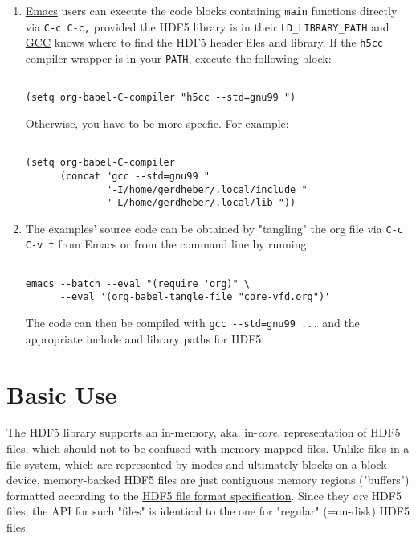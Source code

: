 \documentclass[a4paper, 12pt]{article}
\begin{document}
\begin{enumerate}
\item \href{https://www.gnu.org/software/emacs/}{Emacs} users can execute the code blocks containing \texttt{main} functions
directly via \texttt{C-c C-c,} provided the HDF5 library is in their
\texttt{LD\_LIBRARY\_PATH} and \href{https://gcc.gnu.org/}{GCC} knows where to find the HDF5 header files and
library. If the \texttt{h5cc} compiler wrapper is in your \texttt{PATH}, execute the
following block:

\begin{verbatim}

(setq org-babel-C-compiler "h5cc --std=gnu99 ")

\end{verbatim}

Otherwise, you have to be more specfic. For example:

\begin{verbatim}

(setq org-babel-C-compiler
      (concat "gcc --std=gnu99 "
              "-I/home/gerdheber/.local/include "
              "-L/home/gerdheber/.local/lib "))

\end{verbatim}

\item The examples' source code can be obtained by "tangling" the org file via
\texttt{C-c C-v t} from Emacs or from the command line by running

\begin{verbatim}

emacs --batch --eval "(require 'org)" \
      --eval '(org-babel-tangle-file "core-vfd.org")'

\end{verbatim}

The code can then be compiled with \texttt{gcc -{}-std=gnu99 ...} and the
appropriate include and library paths for HDF5.
\end{enumerate}

\section{Basic Use  \label{org27287be}}
\label{sec:orga1e56f2}

The HDF5 library supports an in-memory, aka. in-\emph{core}, representation of HDF5
files, which should not to be confused with \href{https://en.wikipedia.org/wiki/Memory-mapped\_file}{memory-mapped files}. Unlike files
in a file system, which are represented by inodes and ultimately blocks on a
block device, memory-backed HDF5 files are just contiguous memory regions
("buffers") formatted according to the \href{https://portal.hdfgroup.org/display/HDF5/File+Format+Specification}{HDF5 file format specification}. Since
they \emph{are} HDF5 files, the API for such "files" is identical to the one for
"regular" (=on-disk) HDF5 files.
\end{document}
